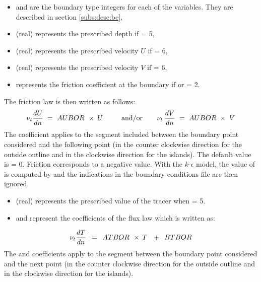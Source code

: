 \begin{itemize}
\item {} and  are
the boundary type integers for each of the variables.
They are described in section \ref{subs:desc:bc},

\item {} (real) represents the prescribed depth if 
= 5,

\item {} (real) represents the prescribed velocity $U$
if  = 6,

\item {} (real) represents the prescribed velocity $V$
if  = 6,

\item {} represents the friction coefficient at the boundary
if  or  = 2.
\end{itemize}
The friction law is then written as follows:
\[\nu _{t} \frac{dU}{dn} {\kern 1pt} {\kern 1pt} {\kern 1pt} ={\kern 1pt} {\kern 1pt} {\kern 1pt} AUBOR{\kern 1pt} {\kern 1pt} {\kern 1pt} {\kern 1pt} \times{\kern 1pt} {\kern 1pt} U{\kern 1pt} {\kern 1pt} {\kern 1pt} {\kern 1pt} {\kern 1pt} {\kern 1pt} {\kern 1pt} {\kern 1pt} {\kern 1pt} {\kern 1pt} {\kern 1pt} {\kern 1pt} {\kern 1pt} {\rm ~~~~and/or~~~~ } {\kern 1pt} {\kern 1pt} {\kern 1pt} {\kern 1pt} {\kern 1pt} {\kern 1pt} {\kern 1pt} \nu _{t} {\kern 1pt} {\kern 1pt} \frac{dV}{dn} {\kern 1pt} {\kern 1pt} {\kern 1pt} ={\kern 1pt} {\kern 1pt} {\kern 1pt} AUBOR{\kern 1pt} {\kern 1pt} {\kern 1pt} \times {\kern 1pt} {\kern 1pt} {\kern 1pt} V\]
The  coefficient applies to the segment included between
the boundary point considered and the following point
(in the counter clockwise direction for the outside outline
and in the clockwise direction for the islands).
The default value is  = 0.
Friction corresponds to a negative value.
With the $k$-$\epsilon$ model, the value of  is computed by
 and the indications in the boundary conditions file are then
ignored.

\begin{itemize}
\item {} (real) represents the prescribed value of the tracer when
 = 5.

\item {} and  represent the coefficients of the
flux law which is written as:
\end{itemize}
\[\nu _{t} \frac{dT}{dn} {\kern 1pt} {\kern 1pt} {\kern 1pt} {\kern 1pt} {\kern 1pt} ={\kern 1pt} {\kern 1pt} {\kern 1pt} {\kern 1pt} {\kern 1pt} ATBOR{\kern 1pt} {\kern 1pt} {\kern 1pt} {\kern 1pt} \times {\kern 1pt} {\kern 1pt} T{\kern 1pt} {\kern 1pt} {\kern 1pt} {\kern 1pt} {\kern 1pt} {\kern 1pt} {\kern 1pt} +{\kern 1pt} {\kern 1pt} {\kern 1pt} {\kern 1pt} {\kern 1pt} BTBOR\]
The  and  coefficients apply to the segment
between the boundary point considered and the next point
(in the counter clockwise direction for the outside outline and in the
clockwise direction for the islands).

